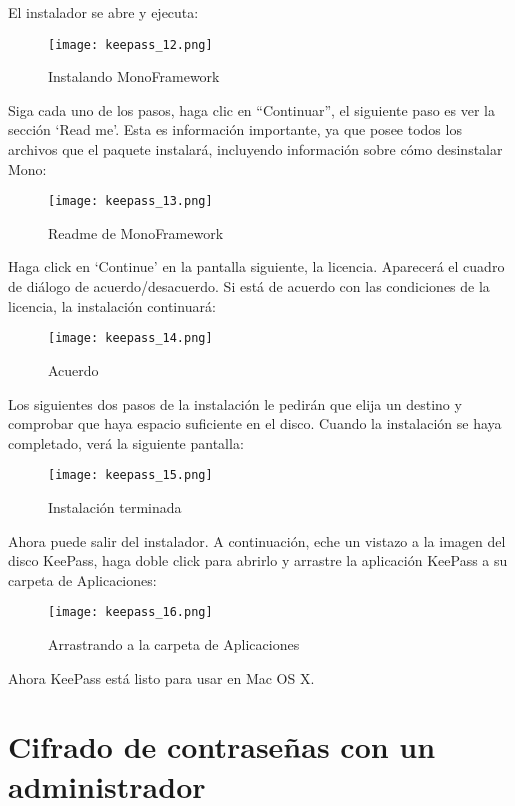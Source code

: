 \documentclass[10pt,a5paper,twoside,,]{book}
\begin{document}
El instalador se abre y ejecuta:

\begin{figure}[htbp]
\centering
\texttt{[image: keepass\_12.png]}
\caption{Instalando MonoFramework}
\end{figure}

Siga cada uno de los pasos, haga clic en ``Continuar'', el siguiente
paso es ver la sección `Read me'. Esta es información importante, ya que
posee todos los archivos que el paquete instalará, incluyendo
información sobre cómo desinstalar Mono:

\begin{figure}[htbp]
\centering
\texttt{[image: keepass\_13.png]}
\caption{Readme de MonoFramework}
\end{figure}

Haga click en `Continue' en la pantalla siguiente, la licencia.
Aparecerá el cuadro de diálogo de acuerdo/desacuerdo. Si está de acuerdo
con las condiciones de la licencia, la instalación continuará:

\begin{figure}[htbp]
\centering
\texttt{[image: keepass\_14.png]}
\caption{Acuerdo}
\end{figure}

Los siguientes dos pasos de la instalación le pedirán que elija un
destino y comprobar que haya espacio suficiente en el disco. Cuando la
instalación se haya completado, verá la siguiente pantalla:

\begin{figure}[htbp]
\centering
\texttt{[image: keepass\_15.png]}
\caption{Instalación terminada}
\end{figure}

Ahora puede salir del instalador. A continuación, eche un vistazo a la
imagen del disco KeePass, haga doble click para abrirlo y arrastre la
aplicación KeePass a su carpeta de Aplicaciones:

\begin{figure}[htbp]
\centering
\texttt{[image: keepass\_16.png]}
\caption{Arrastrando a la carpeta de Aplicaciones}
\end{figure}

Ahora KeePass está listo para usar en Mac OS X.

\chapter{Cifrado de contraseñas con un
administrador}\label{cifrado-de-contraseuxf1as-con-un-administrador}
\end{document}
